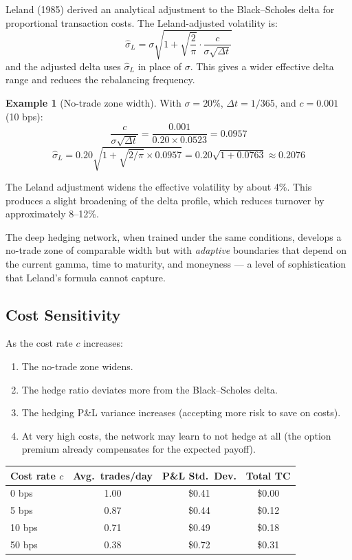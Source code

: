 \documentclass[11pt, a4paper]{article}
\theoremstyle{definition}
\newtheorem{example}{Example}[section]
\theoremstyle{plain}
\theoremstyle{remark}
\begin{document}
Leland (1985) derived an analytical adjustment to the Black--Scholes delta for
proportional transaction costs.
The Leland-adjusted volatility is:
\[
    \hat{\sigma}_L = \sigma\sqrt{1 + \sqrt{\frac{2}{\pi}} \cdot \frac{c}{\sigma\sqrt{\Delta t}}}
\]
and the adjusted delta uses $\hat{\sigma}_L$ in place of $\sigma$.
This gives a wider effective delta range and reduces the rebalancing frequency.

\begin{example}[No-trade zone width]\label{ex:no-trade}
With $\sigma = 20\%$, $\Delta t = 1/365$, and $c = 0.001$ (10 bps):
\[
    \frac{c}{\sigma\sqrt{\Delta t}} = \frac{0.001}{0.20 \times 0.0523} = 0.0957
\]
\[
    \hat{\sigma}_L = 0.20\sqrt{1 + \sqrt{2/\pi} \times 0.0957}
    = 0.20\sqrt{1 + 0.0763} \approx 0.2076
\]

The Leland adjustment widens the effective volatility by about 4\%.
This produces a slight broadening of the delta profile,
which reduces turnover by approximately 8--12\%.

The deep hedging network, when trained under the same conditions,
develops a no-trade zone of comparable width but with \emph{adaptive} boundaries
that depend on the current gamma, time to maturity, and moneyness ---
a level of sophistication that Leland's formula cannot capture.
\end{example}

\subsection{Cost Sensitivity}

As the cost rate $c$ increases:
\begin{enumerate}
    \item The no-trade zone widens.
    \item The hedge ratio deviates more from the Black--Scholes delta.
    \item The hedging P\&L variance increases (accepting more risk to save on costs).
    \item At very high costs, the network may learn to not hedge at all
          (the option premium already compensates for the expected payoff).
\end{enumerate}

\begin{center}
\begin{tabular}{@{}lccc@{}}
\toprule
\textbf{Cost rate} $c$ & \textbf{Avg.\ trades/day} & \textbf{P\&L Std.\ Dev.} & \textbf{Total TC} \\
\midrule
0 bps      & 1.00 & \$0.41 & \$0.00 \\
5 bps      & 0.87 & \$0.44 & \$0.12 \\
10 bps     & 0.71 & \$0.49 & \$0.18 \\
50 bps     & 0.38 & \$0.72 & \$0.31 \\
\bottomrule
\end{tabular}
\end{center}
\end{document}
